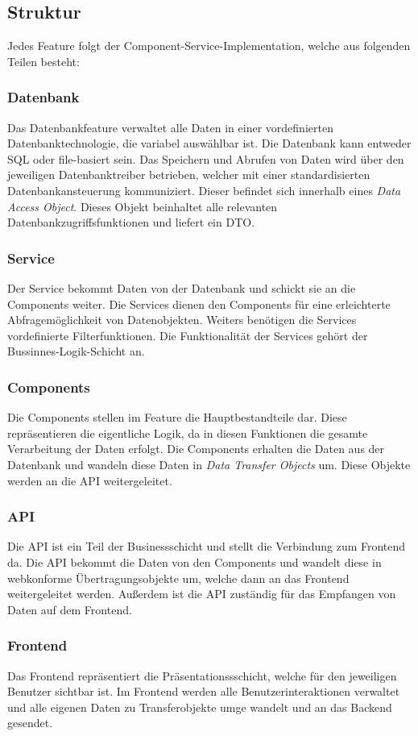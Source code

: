 \subsection{Struktur}
Jedes Feature folgt der Component-Service-Implementation, welche aus folgenden Teilen besteht:
\subsubsection{Datenbank}
Das Datenbankfeature verwaltet alle Daten in einer vordefinierten Datenbanktechnologie, die variabel auswählbar ist. Die Datenbank kann entweder SQL oder file-basiert sein. Das Speichern und Abrufen von Daten wird über den jeweiligen Datenbanktreiber betrieben, welcher mit einer standardisierten Datenbankansteuerung kommuniziert. Dieser befindet sich innerhalb eines \textit{Data Access Object}. Dieses Objekt beinhaltet alle relevanten Datenbankzugriffsfunktionen und liefert ein DTO.
\subsubsection{Service}
Der Service bekommt Daten von der Datenbank und schickt sie an die Components weiter. Die Services dienen den Components für eine erleichterte Abfragemöglichkeit von Datenobjekten. Weiters benötigen die Services vordefinierte Filterfunktionen. Die Funktionalität der Services gehört der Bussinnes-Logik-Schicht an.
\subsubsection{Components}
Die Components stellen im Feature die Hauptbestandteile dar. Diese repräsentieren die eigentliche Logik, da in diesen Funktionen die gesamte Verarbeitung der Daten erfolgt.
Die Components erhalten die Daten aus der Datenbank und wandeln diese Daten in \textit{Data Transfer Objects} um. Diese Objekte werden an die API weitergeleitet.
\subsubsection{API}
Die API ist ein Teil der Businessschicht und stellt die Verbindung zum Frontend da. Die API bekommt die Daten von den Components und wandelt diese in webkonforme Übertragungsobjekte um, welche dann an das Frontend weitergeleitet werden. Außerdem ist die API zuständig für das Empfangen von Daten auf dem Frontend.
\subsubsection{Frontend}
Das Frontend repräsentiert die Präsentationssschicht, welche für den jeweiligen Benutzer sichtbar ist. Im Frontend werden alle Benutzerinteraktionen verwaltet und alle eigenen Daten zu Transferobjekte umge wandelt und an das Backend gesendet.

 
